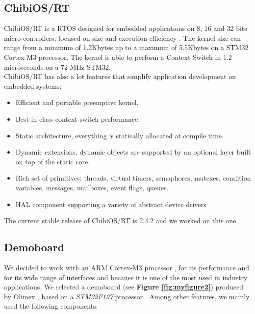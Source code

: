 \documentclass[a4paper,10pt]{article}
\begin{document}
\begin{multicols}{2}
\subsection{ChibiOS/RT}

ChibiOS/RT is a RTOS designed for embedded applications on 8, 16 and 32 bits micro-controllers, focused on size and execution efficiency \cite{wikiChibi}. The kernel size can range from a minimum of 1.2Kbytes up to a maximum of 5.5Kbytes  on a STM32 Cortex\texttrademark-M3 processor. The kernel is able to perform a Context Switch in 1.2 microseconds on a 72 MHz STM32.\\
ChibiOS/RT has also a lot features \cite{chibiHP} that simplify application development on embedded systems:

\begin{itemize}
\item Efficient and portable preemptive kernel,
\item Best in class context switch performance.
\item Static architecture, everything is statically allocated at compile time.
\item Dynamic extensions, dynamic objects are supported by an optional layer built on top of the static core.
\item Rich set of primitives: threads, virtual timers, semaphores, mutexes, condition variables, messages, mailboxes, event flags, queues.
\item HAL component supporting a variety of abstract device drivers
\end{itemize}

The current stable release of ChibiOS/RT is 2.4.2 and we worked on this one.


\subsection{Demoboard}

We decided to work with an ARM Cortex\texttrademark-M3 processor \cite{armcm3}, for its performance and for its wide range of interfaces and because it is one of the most used in industry applications. We selected a demoboard (see {\bf Figure \ref{fig:myfigure2}}) produced by Olimex \cite{olimex}, based on a \textit{STM32F107} processor \cite{stm32f107}.
Among other features, we mainly used the following components:


\end{multicols}
\end{document}
